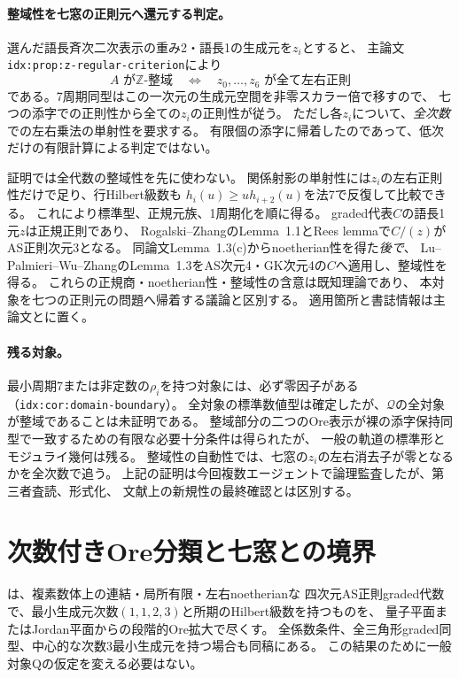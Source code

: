 \documentclass[11pt,a4paper]{ltjsarticle}
\begin{document}
\paragraph{整域性を七窓の正則元へ還元する判定。}
選んだ語長斉次二次表示の重み2・語長1の生成元を$z_i$とすると、
主論文\texttt{idx:prop:z-regular-criterion}により
\[
 A\text{ が}\mathbb Z\text{-整域}
 \quad\Longleftrightarrow\quad
 z_0,\ldots,z_6\text{ が全て左右正則}
\]
である。7周期同型はこの一次元の生成元空間を非零スカラー倍で移すので、
七つの添字での正則性から全ての$z_i$の正則性が従う。
ただし各$z_i$について、\emph{全次数}での左右乗法の単射性を要求する。
有限個の添字に帰着したのであって、低次だけの有限計算による判定ではない。

証明では全代数の整域性を先に使わない。
関係射影の単射性には$z_i$の左右正則性だけで足り、行Hilbert級数も
$h_i(u)\geq u h_{i+2}(u)$を法7で反復して比較できる。
これにより標準型、正規元族、1周期化を順に得る。
graded代表$C$の語長1元$z$は正規正則であり、
Rogalski--ZhangのLemma~1.1とRees lemmaで$C/(z)$がAS正則次元3となる。
同論文Lemma~1.3(c)からnoetherian性を得た\emph{後で}、
Lu--Palmieri--Wu--ZhangのLemma~1.3をAS次元4・GK次元4の$C$へ適用し、整域性を得る。
これらの正規商・noetherian性・整域性の含意は既知理論であり、
本対象を七つの正則元の問題へ帰着する議論と区別する。
適用箇所と書誌情報は主論文とに置く。

\paragraph{残る対象。}
最小周期7または非定数の$\rho_i$を持つ対象には、必ず零因子がある
（\texttt{idx:cor:domain-boundary}）。
全対象の標準数値型は確定したが、$\mathcal Q$の全対象が整域であることは未証明である。
整域部分の二つのOre表示が裸の添字保持同型で一致するための有限な必要十分条件は得られたが、
一般の軌道の標準形とモジュライ幾何は残る。
整域性の自動性では、七窓の$z_i$の左右消去子が零となるかを全次数で追う。
上記の証明は今回複数エージェントで論理監査したが、第三者査読、形式化、
文献上の新規性の最終確認とは区別する。

\section{次数付きOre分類と七窓との境界}
は、複素数体上の連結・局所有限・左右noetherianな
四次元AS正則graded代数で、最小生成元次数$(1,1,2,3)$と所期のHilbert級数を持つものを、
量子平面またはJordan平面からの段階的Ore拡大で尽くす。
全係数条件、全三角形graded同型、中心的な次数3最小生成元を持つ場合も同稿にある。
この結果のために一般対象Qの仮定を変える必要はない。
\end{document}
